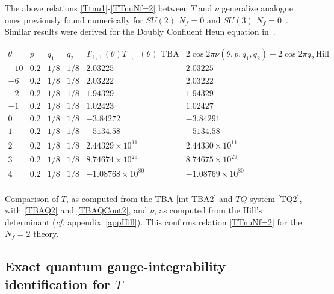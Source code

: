 \documentclass[11pt,a4paper]{elsarticle}
\numberwithin{figure}{section}
\numberwithin{table}{section}
\begin{document}
The above relations \eqref{Ttnu1}-\eqref{TTnuNf=2} between $T$ and $\nu$ generalize analogue ones previously found numerically for $SU(2)$ $N_f=0$ and $SU(3)$ $N_f=0$~\cite{ZamolodchikovMemorial,FioravantiGregori:2019,FioravantiPoghossian:2019}. Similar results were derived for the Doubly Confluent Heun equation in~\cite{Ronveaux:1995}.


\begin{table}
\centering
$\begin{array}{c|c|c|c|c|c}
\theta & p& q_1 & q_2 &  T_{+,+}(\theta)T_{-,-}(\theta) \text{ TBA}& 2 \cos 2 \pi \nu(\theta,p,q_1,q_2) + 2 \cos 2 \pi q_2  \,\text{Hill}\\
\hline
 -10 & 0.2 & 1/8 & 1/8 & 2.03225 & 2.03225 \\
 -6 & 0.2 & 1/8 & 1/8 & 2.03222 & 2.03222 \\
 -2 & 0.2 & 1/8 & 1/8 & 1.94329 & 1.94329 \\
 -1 & 0.2 & 1/8 & 1/8 & 1.02423 & 1.02427 \\
 0 & 0.2 & 1/8 & 1/8 & -3.84272 & -3.84291 \\
 1 & 0.2 & 1/8 & 1/8 & -5134.58 & -5134.58 \\
 2 & 0.2 & 1/8 & 1/8 & 2.44329\times 10^{11} & 2.44330\times 10^{11} \\
 3 & 0.2 & 1/8 & 1/8 & 8.74674\times 10^{29} & 8.74675\times 10^{29} \\
 4 & 0.2 & 1/8 & 1/8 & -1.08768\times 10^{80} & -1.08769\times 10^{80}\\
\end{array}$
\caption{Comparison of $T$, as computed from the TBA \eqref{int-TBA2} and $TQ$ system \eqref{TQ2}, with \eqref{TBAQ2} and \eqref{TBAQCont2}, and $ \nu $, as computed from the Hill's determinant (\textit{cf.} appendix~\ref{appHill}). This confirms relation \eqref{TTnuNf=2} for the $N_f=2$ theory.}\label{tab:TvsNuNf2}
\end{table}
  
 
 
 





\subsection{Exact quantum gauge-integrability identification for $T$} \label{subsec:Ta}
\end{document}
